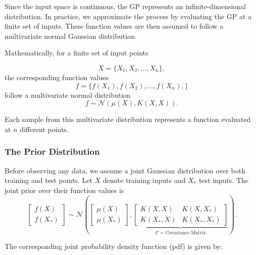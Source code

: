\documentclass{article}
\begin{document}
\noindent
Since the input space is continuous, the GP represents an infinite-dimensional distribution. 
In practice, we approximate the process by evaluating the GP at a finite set of inputs.
These function values are then assumed to follow a multivariate normal Gaussian distribution.

\noindent
Mathematically, for a finite set of input points

\begin{equation}
X = \{X_1, X_2, \dots, X_n\},
\end{equation}
 the corresponding function values
\begin{equation}
f = \{f(X_1),f(X_2),...,f(X_n), \}
\end{equation}
follow a multivariate normal distribution
\begin{equation}
f \sim \mathcal{N}(\mu(X), K(X, X)).
\label{eq: Multivariate_distribution}
\end{equation}

\noindent
Each sample from this multivariate distribution represents a function evaluated at \( n \) different points.

\subsubsection*{The Prior Distribution}
\label{sec: prior_dist}

Before observing any data, we assume a joint Gaussian distribution over both training and test points. Let \( X \) denote training inputs and \( X_* \) test inputs. 
The joint prior over their function values is
\begin{equation}
\begin{bmatrix}
f(X) \\
f(X_*)
\end{bmatrix}
\sim \mathcal{N}
\left(
\begin{bmatrix}
\mu(X) \\
\mu(X_*)
\end{bmatrix},
\underbrace{
\begin{bmatrix}
K(X, X) & K(X, X_*) \\
K(X_*, X) & K(X_*, X_*)
\end{bmatrix}
}_{\mathcal{C} = \text{Covariance Matrix}}
\right).
\label{eq: Multivariate prior}
\end{equation}

\noindent
The corresponding joint probability density function (pdf) is given by:
\end{document}
